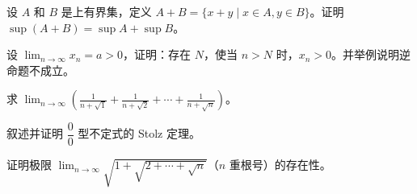 \begin{xexercise}[1]
设 $A$ 和 $B$ 是上有界集，定义 $A+B=\{x+y\mid x\in A,y\in B\}$。证明 $\sup(A+B)=\sup A+\sup B$。
\end{xexercise}

\begin{xexercise}[2]
设 $\displaystyle\lim_{n\to\infty}x_n=a>0$，证明：存在 $N$，使当 $n>N$ 时，$x_n>0$。并举例说明逆命题不成立。
\end{xexercise}

\begin{xexercise}[3]
求 $\displaystyle\lim_{n\to\infty}\left(\frac1{n+\sqrt1}+\frac1{n+\sqrt2}+\cdots+\frac1{n+\sqrt n}\right)$。
\end{xexercise}

\begin{xexercise}[4]
叙述并证明 $\dfrac00$ 型不定式的 Stolz 定理。
\end{xexercise}

\begin{xexercise}[5]
证明极限 $\displaystyle\lim_{n\to\infty}\sqrt{1+\sqrt{2+\cdots+\sqrt n}}$（$n$ 重根号）的存在性。
\end{xexercise}
